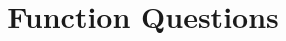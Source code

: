 \documentclass{ximera}
\title{Function Questions}
\begin{document}
\begin{abstract}
\end{abstract}

\maketitle





\begin{sectionOutcomes}



\end{sectionOutcomes}
\end{document}
